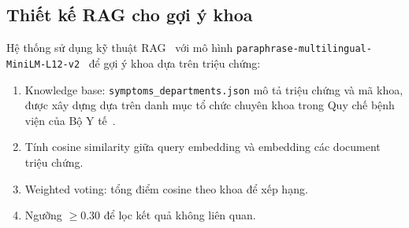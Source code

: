\documentclass[a4paper,13pt,3p,oneside]{report}
\theoremstyle{definition}
\theoremstyle{remark}
\theoremstyle{definition}
\begin{document}
\subsection{Thiết kế RAG cho gợi ý khoa}

Hệ thống sử dụng kỹ thuật RAG~\cite{rag} với mô hình \texttt{paraphrase-multilingual-MiniLM-L12-v2}~\cite{sbert} để gợi ý khoa dựa trên triệu chứng:
\begin{enumerate}
  \item Knowledge base: \texttt{symptoms\_departments.json} mô tả triệu chứng và mã khoa, được xây dựng dựa trên danh mục tổ chức chuyên khoa trong Quy chế bệnh viện của Bộ Y tế~\cite{quychebv}.
  \item Tính cosine similarity giữa query embedding và embedding các document triệu chứng.
  \item Weighted voting: tổng điểm cosine theo khoa để xếp hạng.
  \item Ngưỡng $\geq 0.30$ để lọc kết quả không liên quan.
\end{enumerate}
\end{document}
